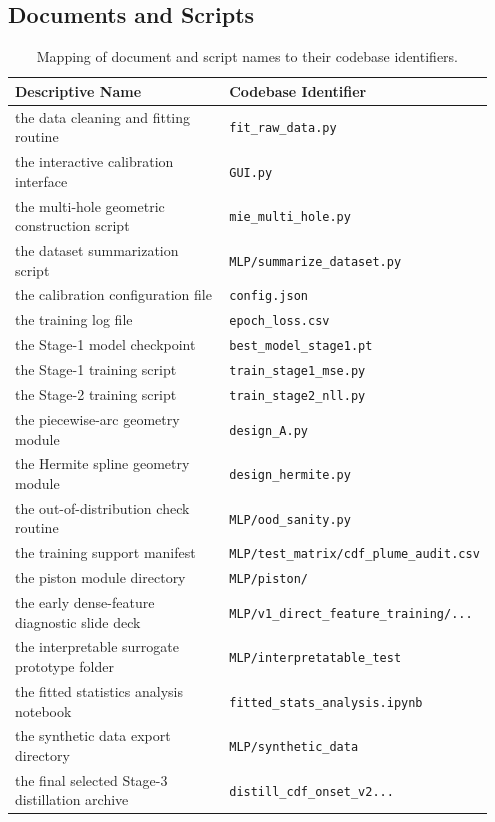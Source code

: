 \documentclass[english, 12pt, a4paper, elec, utf8, a-2b, online]{aaltothesis}
\DeclareRobustCommand{\codepath}[1]{\nolinkurl{#1}}
\begin{document}
\subsection{Documents and Scripts}

\begin{table}[h]
\centering
\begin{tabular}{p{0.45\linewidth} p{0.5\linewidth}}
\toprule
\textbf{Descriptive Name} & \textbf{Codebase Identifier} \\
\midrule
the data cleaning and fitting routine & \texttt{fit\_raw\_data.py} \\
the interactive calibration interface & \texttt{GUI.py} \\
the multi-hole geometric construction script & \codepath{mie\_multi\_hole.py} \\
the dataset summarization script & \texttt{MLP/summarize\_dataset.py} \\
the calibration configuration file & \texttt{config.json} \\
the training log file & \codepath{epoch\_loss.csv} \\
the Stage-1 model checkpoint & \codepath{best\_model\_stage1.pt} \\
the Stage-1 training script & \texttt{train\_stage1\_mse.py} \\
the Stage-2 training script & \texttt{train\_stage2\_nll.py} \\
the piecewise-arc geometry module & \codepath{design\_A.py} \\
the Hermite spline geometry module & \codepath{design\_hermite.py} \\
the out-of-distribution check routine & \codepath{MLP/ood\_sanity.py} \\
the training support manifest & \codepath{MLP/test\_matrix/cdf\_plume\_audit.csv} \\
the piston module directory & \codepath{MLP/piston/} \\
the early dense-feature diagnostic slide deck & \codepath{MLP/v1\_direct\_feature\_training/...} \\
the interpretable surrogate prototype folder & \codepath{MLP/interpretatable\_test} \\
the fitted statistics analysis notebook & \texttt{fitted\_stats\_analysis.ipynb} \\
the synthetic data export directory & \codepath{MLP/synthetic\_data} \\
the final selected Stage-3 distillation archive & \codepath{distill\_cdf\_onset\_v2...} \\
\bottomrule
\end{tabular}
\caption{Mapping of document and script names to their codebase identifiers.}
\end{table}
\end{document}
